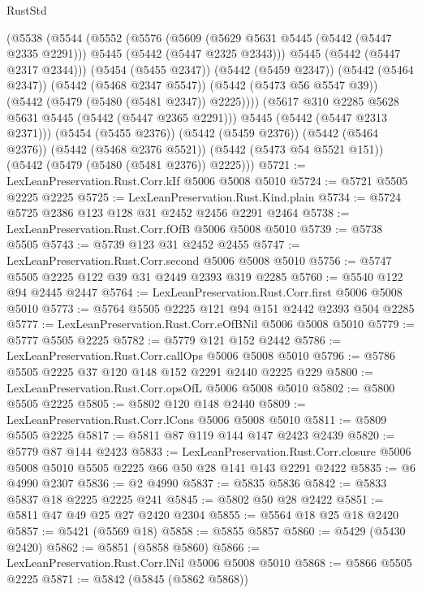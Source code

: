\begin{lexlean}{RustStd}
\begin{coremodule}
{\begin{coremodule}
{{{{{{{{{{{{      (@5538
        (@5544
          (@5552
            (@5576
              (@5609
                (@5629 @5631 @5445 (@5442 (@5447 @2335 @2291)))
                @5445
                (@5442 (@5447 @2325 @2343)))
              @5445
              (@5442 (@5447 @2317 @2344)))
            (@5454 (@5455 @2347))
            (@5442 (@5459 @2347))
            (@5442 (@5464 @2347))
            (@5442 (@5468 @2347 @5547))
            (@5442 (@5473 @56 @5547 @39))
            (@5442 (@5479 (@5480 (@5481 @2347)) @2225))))
        (@5617 @310 @2285 @5628 @5631 @5445 (@5442 (@5447 @2365 @2291)))
        @5445
        (@5442 (@5447 @2313 @2371)))
      (@5454 (@5455 @2376))
      (@5442 (@5459 @2376))
      (@5442 (@5464 @2376))
      (@5442 (@5468 @2376 @5521))
      (@5442 (@5473 @54 @5521 @151))
      (@5442 (@5479 (@5480 (@5481 @2376)) @2225)))
@5721 := LexLeanPreservation.Rust.Corr.kIf @5006 @5008 @5010
@5724 := @5721 @5505 @2225 @2225
@5725 := LexLeanPreservation.Rust.Kind.plain
@5734 := @5724 @5725 @2386 @123 @128 @31 @2452 @2456 @2291 @2464
@5738 := LexLeanPreservation.Rust.Corr.fOfB @5006 @5008 @5010
@5739 := @5738 @5505
@5743 := @5739 @123 @31 @2452 @2455
@5747 := LexLeanPreservation.Rust.Corr.second @5006 @5008 @5010
@5756 := @5747 @5505 @2225 @122 @39 @31 @2449 @2393 @319 @2285
@5760 := @5540 @122 @94 @2445 @2447
@5764 := LexLeanPreservation.Rust.Corr.first @5006 @5008 @5010
@5773 := @5764 @5505 @2225 @121 @94 @151 @2442 @2393 @504 @2285
@5777 := LexLeanPreservation.Rust.Corr.eOfBNil @5006 @5008 @5010
@5779 := @5777 @5505 @2225
@5782 := @5779 @121 @152 @2442
@5786 := LexLeanPreservation.Rust.Corr.callOps @5006 @5008 @5010
@5796 := @5786 @5505 @2225 @37 @120 @148 @152 @2291 @2440 @2225 @229
@5800 := LexLeanPreservation.Rust.Corr.opsOfL @5006 @5008 @5010
@5802 := @5800 @5505 @2225
@5805 := @5802 @120 @148 @2440
@5809 := LexLeanPreservation.Rust.Corr.lCons @5006 @5008 @5010
@5811 := @5809 @5505 @2225
@5817 := @5811 @87 @119 @144 @147 @2423 @2439
@5820 := @5779 @87 @144 @2423
@5833 := LexLeanPreservation.Rust.Corr.closure
    @5006
    @5008
    @5010
    @5505
    @2225
    @66
    @50
    @28
    @141
    @143
    @2291
    @2422
@5835 := @6 @4990 @2307
@5836 := @2 @4990
@5837 := @5835 @5836
@5842 := @5833 @5837 @18 @2225 @2225 @241
@5845 := @5802 @50 @28 @2422
@5851 := @5811 @47 @49 @25 @27 @2420 @2304
@5855 := @5564 @18 @25 @18 @2420
@5857 := @5421 (@5569 @18)
@5858 := @5855 @5857
@5860 := @5429 (@5430 @2420)
@5862 := @5851 (@5858 @5860)
@5866 := LexLeanPreservation.Rust.Corr.lNil @5006 @5008 @5010
@5868 := @5866 @5505 @2225
@5871 := @5842 (@5845 (@5862 @5868))
}}}}}}}}}}}}
\end{coremodule}}
\end{coremodule}
\end{lexlean}
